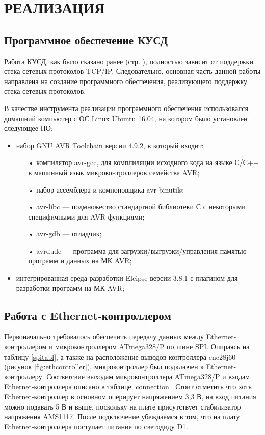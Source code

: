 \chapter{РЕАЛИЗАЦИЯ}

\section{Программное обеспечение КУСД}

Работа КУСД, как было сказано ранее (стр. \pageref{reasonofwork}), полностью зависит от поддержки стека сетевых протоколов TCP/IP. Следовательно, основная часть данной работы направлена на создание программного обеспечения, реализующего поддержку стека сетевых протоколов.

В качестве инструмента реализации программного обеспечения использовался домашний компьютер с ОС Linux Ubuntu 16.04, на котором было установлен следующее ПО:
 \begin{itemize}
	\item набор GNU AVR Toolchain версии 4.9.2, в который входит\cite{avrtoolchain}:
	\begin{itemize}
		\item[•] компилятор avr-gcc, для комплиляции исходного кода на языке С/С++ в машинный язык микроконтроллеров семейства AVR;
		\item[•] набор ассемблера и компоновщика avr-binutils;
		\item[•] avr-libc --- подмножество стандартной библиотеки С с некоторыми специфичными для AVR функциями;
		\item[•] avr-gdb --- отладчик;
		\item[•] avrdude --- программа для загрузки/выгрузки/управления памятью программ и данных на МК AVR;
	\end{itemize}
	\item интегрированная среда разработки Elcipse версии 3.8.1 с плагином для разработки программ на МК AVR;
\end{itemize}

\section{Работа с Ethernet-контроллером}

Первоначально требовалось обеспечить передачу данных между Ethernet-контроллером и микроконтроллером ATmega328/P по шине SPI. Опираясь на таблицу \ref{spitabl}, а также на расположение выводов контроллера enc28j60 (рисунок \ref{fig:ethcontroller}), микроконтроллер был подключен к Ethernet-контроллеру. Соответсвие выходам микроконтроллера ATmega328/P и входам Ethernet-контроллера описано в таблице \ref{connection}. Стоит отметить что хоть Ethernet-контроллер в основном оперирует напряжением 3,3 В, на вход питания можно подавать 5 В и выше, поскольку на плате присутствует стабилизатор напряжения AMS1117\cite{voltageregulator}. После подключение убеждаемся в том, что на плату Ethernet-контроллера поступает питание по светодиду D1. 

